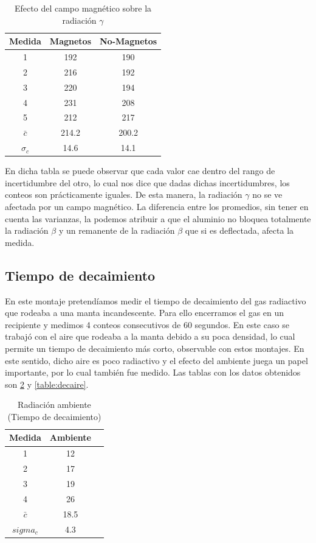 \documentclass[%
 reprint,
 amsmath,amssymb,
 aps,
]{revtex4-1}
\begin{document}
\begin{table}[h!]
\centering
 \begin{tabular}{|c|c|c|} 
 \hline
 Medida & Magnetos & No-Magnetos \\ [0.5ex] 
 \hline\hline
 1&192&190\\
2&216&192\\
3&220&194\\
4&231&208\\
5&212&217\\
$\bar{c}$&214.2&200.2\\
$\sigma_c$&14.6&14.1\\
[1ex] 
 \hline
 \end{tabular}
 \caption{Efecto del campo magnético sobre la radiación $\gamma$}
 \label{table:magplaca}
\end{table}

En dicha tabla se puede observar que cada valor cae dentro del rango de incertidumbre del otro, lo cual nos dice que dadas dichas incertidumbres, los conteos son prácticamente iguales. De esta manera, la radiación $\gamma$ no se ve afectada por un campo magnético. La diferencia entre los promedios, sin tener en cuenta las varianzas, la podemos atribuir a que el aluminio no bloquea totalmente la radiación $\beta$ y un remanente de la radiación $\beta$ que si es deflectada, afecta la medida.\\

\subsection{\label{sec:level2}Tiempo de decaimiento}
En este montaje pretendíamos medir el tiempo de decaimiento del gas radiactivo que rodeaba a una manta incandescente. Para ello encerramos el gas en un recipiente y medimos 4 conteos consecutivos de 60 segundos. En este caso se trabajó con el aire que rodeaba a la manta debido a su poca densidad, lo cual permite un tiempo de decaimiento más corto, observable con estos montajes. En este sentido, dicho aire es poco radiactivo y el efecto del ambiente juega un papel importante, por lo cual también fue medido. Las tablas con los datos obtenidos son \ref{table:decambiente} y \ref{table:decaire}.\\

\begin{table}[h!]
\centering
 \begin{tabular}{|c|c|c|} 
 \hline
 Medida & Ambiente \\ [0.5ex] 
 \hline\hline
 1&12\\
 2&17\\
 3&19\\
 4&26\\
 $\bar{c}$&18.5\\
 $sigma_c$&4.3\\
[1ex] 
 \hline
 \end{tabular}
 \caption{Radiación ambiente (Tiempo de decaimiento)}
 \label{table:decambiente}
\end{table}
\end{document}
